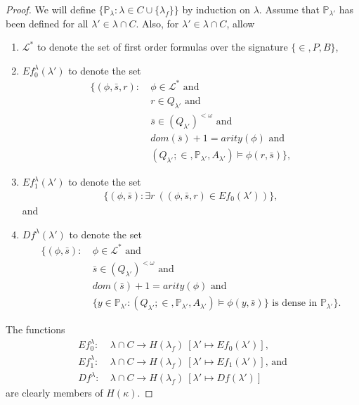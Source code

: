 \documentclass[12pt, twoside]{memoir}
\numberwithin{equation}{section}
\theoremstyle{definition}
\theoremstyle{remark}
\theoremstyle{definition}
\theoremstyle{definition}
\theoremstyle{definition}
\theoremstyle{remark}
\begin{document}
\begin{proof}
We will define $\{\mathbb{P}_{\lambda} : \lambda \in C \cup \{\lambda_f\}\}$ by induction on $\lambda$. Assume that $\mathbb{P}_{\lambda'}$ has been defined for all $\lambda' \in \lambda \cap C$. Also, for $\lambda' \in \lambda \cap C$, allow 
\begin{enumerate}[label=(\Alph*)]
    \item $\mathcal{L^*}$ to denote the set of first order formulas over the signature $\{\in, P, B\}$,
    \item $Ef_0^{\lambda}(\lambda')$ to denote the set 
    \begin{align*}
        \{(\phi, \bar{s}, r) : \ & \phi \in \mathcal{L}^* \text{ and} \\
        & r \in Q_{\lambda'} \text{ and} \\
        & \bar{s} \in (Q_{\lambda'})^{< \omega} \text{ and} \\
        & dom(\bar{s}) + 1 = arity(\phi) \text{ and} \\
        & (Q_{\lambda'}; \in, \mathbb{P}_{\lambda'}, A_{\lambda'}) \models \phi(r, \bar{s})\},
    \end{align*}
    \item $Ef_1^{\lambda}(\lambda')$ to denote the set
    \begin{align*}
        \{(\phi, \bar{s}) : \exists r \ ((\phi, \bar{s}, r) \in Ef_0(\lambda'))\},
    \end{align*}
    and
    \item $Df^{\lambda}(\lambda')$ to denote the set 
    \begin{align*}
        \{(\phi, \bar{s}) : \ & \phi \in \mathcal{L}^* \text{ and} \\
        & \bar{s} \in (Q_{\lambda'})^{< \omega} \text{ and} \\
        & dom(\bar{s}) + 1 = arity(\phi) \text{ and} \\
        & \{y \in \mathbb{P}_{\lambda'} : (Q_{\lambda'}; \in, \mathbb{P}_{\lambda'}, A_{\lambda'}) \models \phi(y, \bar{s})\} \text{ is dense in } \mathbb{P}_{\lambda'}\}.
    \end{align*}
\end{enumerate}
The functions 
\begin{align*}
    Ef_0^{\lambda} : \ & \lambda \cap C \longrightarrow H(\lambda_f) \ [\lambda' \mapsto Ef_0(\lambda')] \text{,} \\
    Ef_1^{\lambda} : \ & \lambda \cap C \longrightarrow H(\lambda_f) \ [\lambda' \mapsto Ef_1(\lambda')] \text{, and}  \\
    Df^{\lambda} : \ & \lambda \cap C \longrightarrow H(\lambda_f) \ [\lambda' \mapsto Df(\lambda')]
\end{align*}
are clearly members of $H(\kappa)$.


\end{proof}
\end{document}
